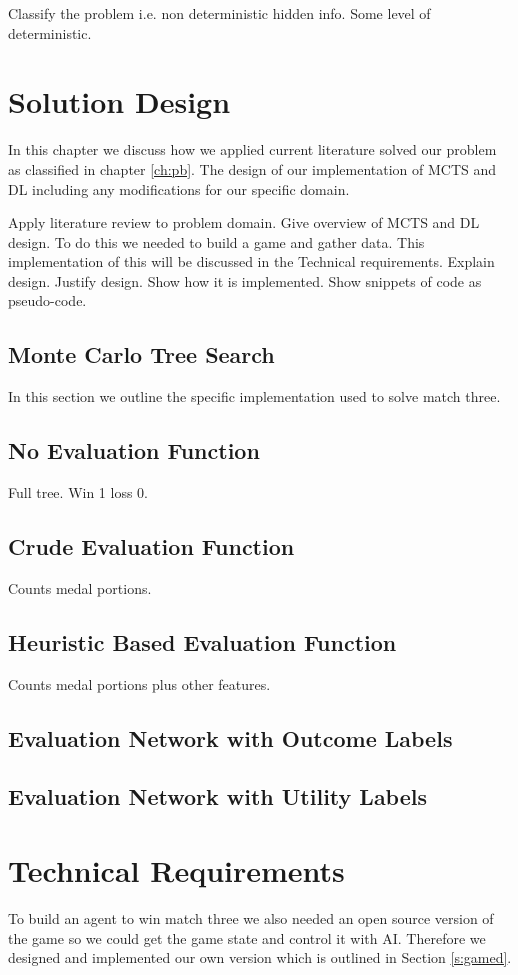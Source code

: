 \documentclass{bhamthesis}
\theoremstyle{definition}
\begin{document}
Classify the problem i.e. non deterministic hidden info. Some level of deterministic.


\chapter{Solution Design}
In this chapter we discuss how we applied current literature solved our problem as classified in chapter \ref{ch:pb}. The design of our implementation of MCTS and DL including any modifications for our specific domain.

Apply literature review to problem domain. Give overview of MCTS and DL design. To do this we needed to build a game and gather data. This implementation of this will be discussed in the Technical requirements.
Explain design.
Justify design.
Show how it is implemented.
Show snippets of code as pseudo-code.

\section{Monte Carlo Tree Search}
In this section we outline the specific implementation used to solve match three.


\section{No Evaluation Function}
Full tree. Win 1 loss 0.

\section{Crude Evaluation Function}
Counts medal portions.

\section{Heuristic Based Evaluation Function}
Counts medal portions plus other features.

\section{Evaluation Network with Outcome Labels}

\section{Evaluation Network with Utility Labels}

\chapter{Technical Requirements}
To build an agent to win match three we also needed an open source version of the game so we could get the game state and control it with AI. Therefore we designed and implemented our own version which is outlined in Section \ref{s:gamed}. 
\end{document}
